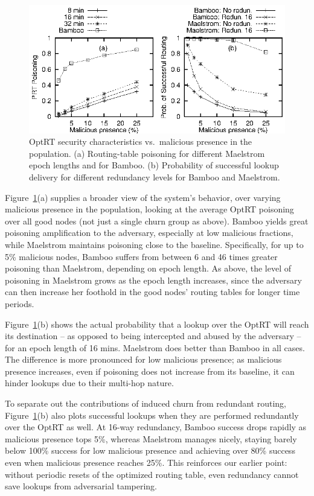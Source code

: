 \documentclass[10pt,twocolumn]{article}
\newcommand{\PRT}{OptRT\xspace}
\begin{document}
\begin{figure}
\centerline{\includegraphics{graphs/prtPoisoning}}
\caption{\PRT security characteristics vs.\ malicious presence in the
  population. (a) Routing-table poisoning for different Maelstrom epoch lengths and for Bamboo.
  (b) Probability of successful lookup delivery for different redundancy
  levels for Bamboo and Maelstrom.}
\label{fig:prtPoisoning}
\end{figure}

Figure~\ref{fig:prtPoisoning}(a) supplies a broader view of the system's
behavior, over varying malicious presence in the population,
looking at the average \PRT poisoning over all good nodes (not just a
single churn group as above).
Bamboo yields great poisoning amplification to the adversary, especially
at low malicious fractions, while Maelstrom
maintains poisoning close to the baseline. Specifically, for up to 5\%
malicious nodes, Bamboo suffers from between 6 and
46 times greater poisoning than Maelstrom, depending on epoch length.
As above, the level of
poisoning in Maelstrom grows as the epoch length increases, since the
adversary can then increase her foothold in the good nodes'
routing tables for longer time periods.

Figure~\ref{fig:prtPoisoning}(b) shows the
actual probability that a lookup over the \PRT will reach its
destination -- as opposed to being intercepted and abused by the
adversary -- for an epoch length of 16 mins. 
Maelstrom does better than Bamboo in all cases. The difference is more pronounced for
low malicious presence; as malicious presence increases, even if
poisoning does not increase from its baseline, it can hinder lookups due
to their multi-hop nature.

To separate out the contributions of induced churn from redundant
routing, Figure~\ref{fig:prtPoisoning}(b) also plots successful lookups
when they are performed redundantly over the \PRT as well.  At 16-way
redundancy, Bamboo success drops rapidly as malicious presence tops 5\%, whereas
Maelstrom manages nicely, staying barely below 100\% success for low
malicious presence and achieving over 80\% success even when
malicious presence reaches 25\%.  This reinforces our earlier point:
without periodic resets of the optimized routing table, even
redundancy cannot
save lookups from adversarial tampering.
\end{document}
